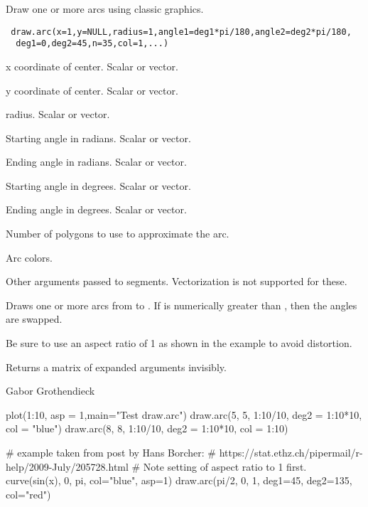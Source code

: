 \begin{Description}\relax
Draw one or more arcs using classic graphics.
\end{Description}
\begin{Usage}
\begin{verbatim}
 draw.arc(x=1,y=NULL,radius=1,angle1=deg1*pi/180,angle2=deg2*pi/180, 
  deg1=0,deg2=45,n=35,col=1,...)
\end{verbatim}
\end{Usage}
\begin{Arguments}
\begin{ldescription}
\item[\code{x}] x coordinate of center.  Scalar or vector. 
\item[\code{y}] y coordinate of center.  Scalar or vector. 
\item[\code{radius}] radius.  Scalar or vector.  
\item[\code{angle1}] Starting angle in radians. Scalar or vector. 
\item[\code{angle2}] Ending angle in radians. Scalar or vector. 
\item[\code{deg1}] Starting angle in degrees. Scalar or vector. 
\item[\code{deg2}] Ending angle in degrees. Scalar or vector. 
\item[\code{n}] Number of polygons to use to approximate the arc. 
\item[\code{col}] Arc colors. 
\item[\code{...}] Other arguments passed to segments.  Vectorization 
is not supported for these. 
\end{ldescription}
\end{Arguments}
\begin{Details}\relax
Draws one or more arcs from  to .
If  is numerically greater than ,
then the angles are swapped.

Be sure to use an aspect ratio of 1 as shown in the example to avoid
distortion.
\end{Details}
\begin{Value}
Returns a matrix of expanded arguments invisibly.
\end{Value}
\begin{Author}\relax
Gabor Grothendieck
\end{Author}
\begin{Examples}
\begin{ExampleCode}

   plot(1:10, asp = 1,main="Test draw.arc")
   draw.arc(5, 5, 1:10/10, deg2 = 1:10*10, col = "blue")
   draw.arc(8, 8, 1:10/10, deg2 = 1:10*10, col = 1:10)

   # example taken from post by Hans Borcher:
   # https://stat.ethz.ch/pipermail/r-help/2009-July/205728.html
   # Note setting of aspect ratio to 1 first.
   curve(sin(x), 0, pi, col="blue", asp=1)
   draw.arc(pi/2, 0, 1, deg1=45, deg2=135, col="red")

\end{ExampleCode}
\end{Examples}

